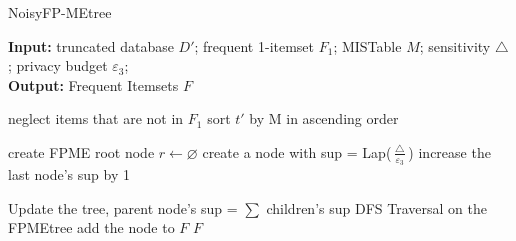\documentclass{article}
\begin{document}
\begin{algorithm}[t]
    \caption{NoisyFP-MEtree}
    \hspace*{0.02in} {\bf Input:} 
    truncated database $D'$; frequent 1-itemset $F_1$; MISTable $M$; sensitivity $\bigtriangleup$; privacy budget $\varepsilon_3$;\\
    \hspace*{0.02in} {\bf Output:} %
    Frequent Itemsets $F$

    \begin{algorithmic}[1]
        
            \State neglect items that are not in $F_1$
            \State sort $t'$ by M in ascending order
        \EndFor 
        
        \State create FPME root node  $r\leftarrow \varnothing$ 
            \State create a node with sup = Lap($\frac{\bigtriangleup}{\varepsilon_3}$) 
            \EndIf
            \EndFor
            \State increase the last node's sup by 1
        \EndFor

        \State Update the tree, parent node's sup = $\sum$ children's sup
        \State DFS Traversal on the FPMEtree
        \State add the node to $F$
        \EndIf
    \State \Return $F$
    \end{algorithmic} 

\end{algorithm}
\end{document}
